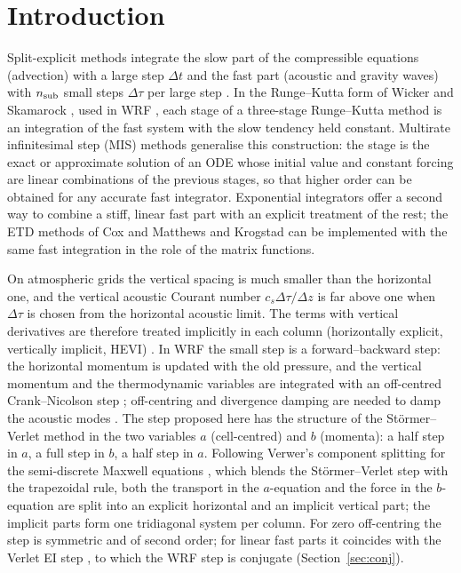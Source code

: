 \documentclass[11pt,a4paper]{article}
\newcommand{\dtau}{\Delta\tau}
\newcommand{\dt}{\Delta t}
\begin{document}
\section{Introduction}\label{sec:intro}
Split-explicit methods integrate the slow part of the compressible equations (advection) with a
large step $\dt$ and the fast part (acoustic and gravity waves) with $n_{\rm sub}$ small steps
$\dtau$ per large step \cite{klempwil,sk92,sk94,ws,ksd,horn}. In the Runge--Kutta form of Wicker and
Skamarock \cite{ws}, used in WRF \cite{wrf}, each stage of a three-stage Runge--Kutta method is an
integration of the fast system with the slow tendency held constant. Multirate infinitesimal step
(MIS) methods \cite{wkg,knothwensch,bauer} generalise this construction: the stage is the exact or
approximate solution of an ODE whose initial value and constant forcing are linear combinations of
the previous stages, so that higher order can be obtained for any accurate fast integrator.
Exponential integrators \cite{hochbruck} offer a second way to combine a stiff, linear fast part with
an explicit treatment of the rest; the ETD methods of Cox and Matthews \cite{coxmatthews} and
Krogstad \cite{krogstad} can be implemented with the same fast integration in the role of the matrix
functions.

On atmospheric grids the vertical spacing is much smaller than the horizontal one, and the vertical
acoustic Courant number $c_s\dtau/\Delta z$ is far above one when $\dtau$ is chosen from the
horizontal acoustic limit. The terms with vertical derivatives are therefore treated implicitly in
each column (horizontally explicit, vertically implicit, HEVI) \cite{klempwil,sk92,ksd,ullrich,gardner}.
In WRF the small step is a forward--backward step: the horizontal momentum is updated with the old
pressure, and the vertical momentum and the thermodynamic variables are integrated with an
off-centred Crank--Nicolson step \cite{ksd,wrf}; off-centring and divergence damping are needed to
damp the acoustic modes \cite{ws,baldauf,ksh}. The step proposed here has the structure of the
Störmer--Verlet method \cite{verlet,hlw} in the two variables $a$ (cell-centred) and $b$ (momenta): a half
step in $a$, a full step in $b$, a half step in $a$. Following Verwer's component splitting for the
semi-discrete Maxwell equations \cite{verwer}, which blends the Störmer--Verlet step with the
trapezoidal rule, both the transport in the $a$-equation and the force in the $b$-equation are split
into an explicit horizontal and an implicit vertical part; the implicit parts form one tridiagonal
system per column. For zero off-centring the step is symmetric and of second order; for linear fast
parts it coincides with the Verlet EI step \cite{imex}, to which the WRF step is conjugate
(Section~\ref{sec:conj}).
\end{document}
